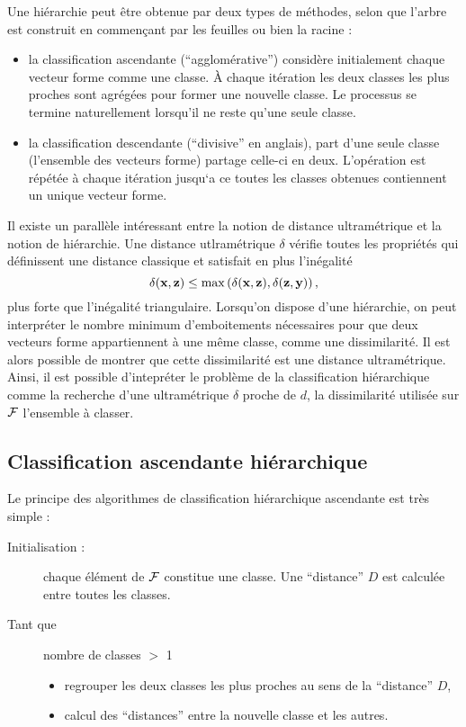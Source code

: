 Une hi\'erarchie peut \^etre obtenue par deux types de m\'ethodes, selon que 
l'arbre est construit en commen\c cant par les feuilles ou bien la racine :
\begin{itemize}
\item la classification ascendante (``agglom\'erative'') consid\`ere
initialement chaque vecteur forme comme une classe. \`A chaque
it\'eration les deux classes les plus proches sont agr\'eg\'ees
pour former une nouvelle classe. Le processus se termine naturellement
lorsqu'il ne reste qu'une seule classe.
\item la classification descendante (``divisive'' en anglais), 
part d'une seule classe (l'ensemble des vecteurs forme)
partage celle-ci en deux. L'op\'eration est r\'ep\'et\'ee
\`a chaque it\'eration jusqu`a ce toutes les classes obtenues
contiennent un unique vecteur forme. 
\end{itemize}             

Il existe un parall\`ele int\'eressant entre la notion de distance ultram\'etrique et la notion
de hi\'erarchie. Une distance utlram\'etrique $\delta$ v\'erifie toutes les propri\'et\'es qui 
d\'efinissent une distance classique et satisfait en plus l'in\'egalit\'e
$$
\delta(\mbox{\bf x},\mbox{\bf z}) \leq \max \left ( \delta(\mbox{\bf x},\mbox{\bf z}),\delta(\mbox{\bf z},\mbox{\bf y}) \right ),
$$
plus forte que l'in\'egalit\'e triangulaire. Lorsqu'on dispose d'une hi\'erarchie, on peut
interpr\'eter le nombre minimum d'emboitements n\'ecessaires pour que deux vecteurs forme
appartiennent \`a une m\^eme classe, comme une dissimilarit\'e. Il est alors possible de 
montrer que cette dissimilarit\'e est une distance ultram\'etrique.
Ainsi, il est possible d'intepr\'eter le probl\`eme
de la classification hi\'erarchique comme la recherche d'une ultram\'etrique $\delta$  proche
de $d$, la dissimilarit\'e  utilis\'ee sur ${\cal F}$ l'ensemble \`a classer.    

\subsection{Classification ascendante hi\'erarchique}
Le principe des algorithmes de classification hi\'erarchique
ascendante est tr\`es simple :
\begin{description}
\item[Initialisation :] chaque \'el\'ement de ${\cal F}$ constitue
une classe. Une ``distance'' $D$ est calcul\'ee entre toutes les
classes. 
\item[Tant que] nombre de classes $>$ 1
\begin{itemize}
\item 
regrouper les deux classes les plus proches au sens de la ``distance''
$D$,
\item
calcul des ``distances'' entre la nouvelle classe et les autres.
\end{itemize} 
\end{description}

